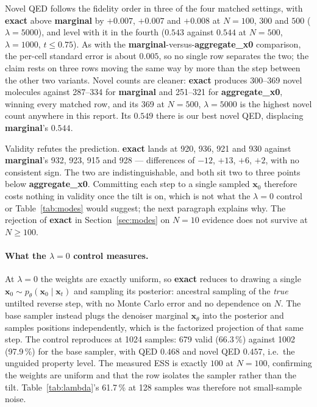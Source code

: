\documentclass[11pt]{article}
\begin{document}
Novel QED follows the fidelity order in three of the four matched settings, with
\textbf{exact} above \textbf{marginal} by $+0.007$, $+0.007$ and $+0.008$ at
$N = 100$, $300$ and $500$ ($\lambda = 5000$), and level with it in the fourth
($0.543$ against $0.544$ at $N{=}500$, $\lambda{=}1000$, $t \le 0.75$). As with
the \textbf{marginal}-versus-\textbf{aggregate\_x0} comparison, the per-cell
standard error is about $0.005$, so no single row separates the two; the claim
rests on three rows moving the same way by more than the step between the other
two variants. Novel counts are cleaner: \textbf{exact} produces 300--369 novel
molecules against 287--334 for \textbf{marginal} and 251--321 for
\textbf{aggregate\_x0}, winning every matched row, and its 369 at $N{=}500$,
$\lambda{=}5000$ is the highest novel count anywhere in this report. Its $0.549$
there is our best novel QED, displacing \textbf{marginal}'s $0.544$.

Validity refutes the prediction. \textbf{exact} lands at 920, 936, 921 and 930
against \textbf{marginal}'s 932, 923, 915 and 928 --- differences of $-12$,
$+13$, $+6$, $+2$, with no consistent sign. The two are indistinguishable, and
both sit two to three points below \textbf{aggregate\_x0}. Committing each step
to a single sampled $\mathbf{x}_0$ therefore costs nothing in validity once the
tilt is on, which is not what the $\lambda = 0$ control or
Table~\ref{tab:modes} would suggest; the next paragraph explains why. The
rejection of \textbf{exact} in Section~\ref{sec:modes} on $N = 10$ evidence does
not survive at $N \ge 100$.

\paragraph{What the $\lambda = 0$ control measures.}
At $\lambda = 0$ the weights are exactly uniform, so \textbf{exact} reduces to
drawing a single $\mathbf{x}_0 \sim p_\theta(\mathbf{x}_0 \mid \mathbf{x}_t)$
and sampling its posterior: ancestral sampling of the \emph{true} untilted
reverse step, with no Monte Carlo error and no dependence on $N$. The base
sampler instead plugs the denoiser marginal $\mathbf{x}_\theta$ into the
posterior and samples positions independently, which is the factorized
projection of that same step. The control reproduces at 1024 samples: 679 valid
(66.3\,\%) against 1002 (97.9\,\%) for the base sampler, with QED $0.468$ and
novel QED $0.457$, i.e.\ the unguided property level. The measured ESS is exactly
$100$ at $N = 100$, confirming the weights are uniform and that the row isolates
the sampler rather than the tilt. Table~\ref{tab:lambda}'s 61.7\,\% at 128
samples was therefore not small-sample noise.
\end{document}
